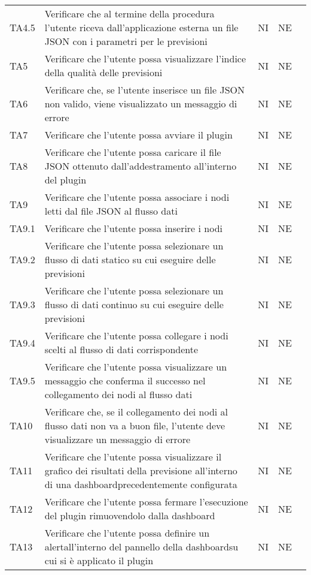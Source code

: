 \begin{longtable} {
		>{\centering}p{15mm} 
		>{\centering}p{79.5mm}
		>{\centering}p{15mm} 
		>{\centering}p{15mm}
		>{}p{0mm}}
	TA4.5 & Verificare che al termine della procedura l'utente riceva dall'applicazione esterna un file JSON con i parametri per le previsioni & NI & NE  &\TBstrut \\ [2mm]
	TA5 & Verificare che l'utente possa visualizzare l'indice della qualità delle previsioni & NI & NE  &\TBstrut \\ [2mm]
	TA6 & Verificare che, se l'utente inserisce un file JSON non valido, viene visualizzato un messaggio di errore & NI & NE  &\TBstrut \\ [2mm]
	TA7 & Verificare che l'utente possa avviare il plugin & NI & NE  &\TBstrut \\ [2mm]
	TA8 & Verificare che l'utente possa caricare il file JSON ottenuto dall'addestramento all'interno del plugin & NI & NE  &\TBstrut \\ [2mm]
	TA9 & Verificare che l'utente possa associare i nodi letti dal file JSON al flusso dati & NI & NE  &\TBstrut \\ [2mm]
	TA9.1 & Verificare che l'utente possa inserire i nodi & NI & NE  &\TBstrut \\ [2mm]
	TA9.2 & Verificare che l'utente possa selezionare un flusso di dati statico su cui eseguire delle previsioni & NI & NE  &\TBstrut \\ [2mm]
	TA9.3 & Verificare che l'utente possa selezionare un flusso di dati continuo su cui eseguire delle previsioni & NI & NE  &\TBstrut \\ [2mm]
	TA9.4 & Verificare che l'utente possa collegare i nodi scelti al flusso di dati corrispondente & NI & NE  &\TBstrut \\ [2mm]
	TA9.5 & Verificare che l'utente possa visualizzare un messaggio che conferma il successo nel collegamento dei nodi al flusso dati & NI & NE  &\TBstrut \\ [2mm]
	TA10 & Verificare che, se il collegamento dei nodi al flusso dati non va a buon file, l'utente deve visualizzare un messaggio di errore & NI & NE  &\TBstrut \\ [2mm]
	TA11 & Verificare che l'utente possa visualizzare il grafico dei risultati della previsione all'interno di una dashboard\glosp precedentemente configurata & NI & NE  &\TBstrut \\ [2mm]
	TA12 & Verificare che l'utente possa fermare l'esecuzione del plugin rimuovendolo dalla dashboard\glo & NI & NE  &\TBstrut \\ [2mm]
	TA13 & Verificare che l'utente possa definire un alert\glosp all'interno del pannello della dashboard\glosp su cui si è applicato il plugin & NI & NE  &\TBstrut \\ [2mm]

\end{longtable}
